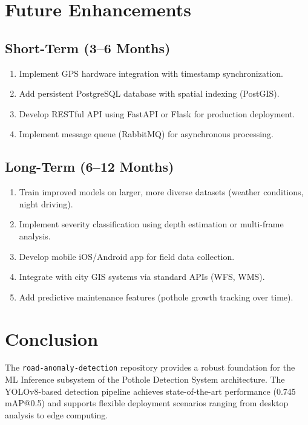 \documentclass[12pt]{article}
\begin{document}
\section{Future Enhancements}

\subsection{Short-Term (3--6 Months)}

\begin{enumerate}
    \item Implement GPS hardware integration with timestamp synchronization.
    \item Add persistent PostgreSQL database with spatial indexing (PostGIS).
    \item Develop RESTful API using FastAPI or Flask for production deployment.
    \item Implement message queue (RabbitMQ) for asynchronous processing.
\end{enumerate}

\subsection{Long-Term (6--12 Months)}

\begin{enumerate}
    \item Train improved models on larger, more diverse datasets (weather conditions, night driving).
    \item Implement severity classification using depth estimation or multi-frame analysis.
    \item Develop mobile iOS/Android app for field data collection.
    \item Integrate with city GIS systems via standard APIs (WFS, WMS).
    \item Add predictive maintenance features (pothole growth tracking over time).
\end{enumerate}

\section{Conclusion}

The \texttt{road-anomaly-detection} repository provides a robust foundation for the ML Inference subsystem of the Pothole Detection System architecture. The YOLOv8-based detection pipeline achieves state-of-the-art performance (0.745 mAP@0.5) and supports flexible deployment scenarios ranging from desktop analysis to edge computing.
\end{document}
